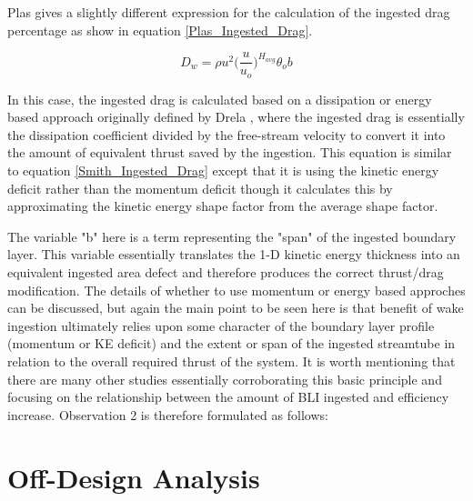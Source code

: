 \documentclass[12pt]{gatech-thesis}
\begin{document}
Plas \cite{Plas2007} gives a slightly different expression for the calculation of the ingested drag percentage as show in equation \ref{Plas_Ingested_Drag}.

\begin{equation}D_w =  \rho u^2 \Big(\frac{u}{u_o}\Big)^{H_{avg}}\theta_o b\label{Plas_Ingested_Drag}\end{equation}%

In this case, the ingested drag is calculated based on a dissipation or energy based approach originally defined by Drela \cite{Drela2009}, where the ingested drag is essentially the dissipation coefficient divided by the free-stream velocity to convert it into the amount of equivalent thrust saved by the ingestion.  This equation is similar to equation \ref{Smith_Ingested_Drag} except that it is using the kinetic energy deficit rather than the momentum deficit though it calculates this by approximating the kinetic energy shape factor from the average shape factor.  

The variable "b" here is a term representing the "span" of the ingested boundary layer.  This variable essentially translates the 1-D kinetic energy thickness into an equivalent ingested area defect and therefore produces the correct thrust/drag modification.  The details of whether to use momentum or energy based approches can be discussed, but again the main point to be seen here is that benefit of wake ingestion ultimately relies upon some character of the boundary layer profile (momentum or KE deficit) and the extent or span of the ingested streamtube in relation to the overall required thrust of the system.  It is worth mentioning that there are many other studies essentially corroborating this basic principle and focusing on the relationship between the amount of BLI ingested and efficiency increase.  Observation 2 is therefore formulated as follows:

\vspace{1pt}
\vspace{5mm}
\vspace{5mm}


\section{Off-Design Analysis}
\end{document}
